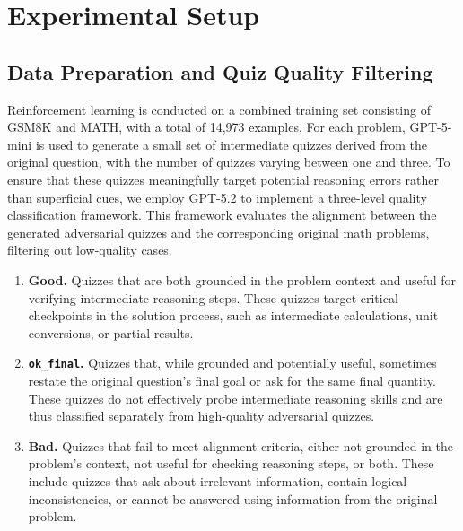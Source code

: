 \documentclass[12pt]{report}
\newcommand{\flag}[1]{\texttt{#1}}
\begin{document}
\section{Experimental Setup}

\subsection{Data Preparation and Quiz Quality Filtering}
\label{sec:data-prep}
Reinforcement learning is conducted on a combined training set consisting of GSM8K and MATH, with a total of 14,973 examples. For each problem, GPT-5-mini is used to  generate a small set of intermediate quizzes derived from the original question, with the number of quizzes varying between one and three. To ensure that these quizzes meaningfully target potential reasoning errors rather than superficial cues, we employ GPT-5.2 to implement a three-level quality classification framework. This framework evaluates the alignment between the generated adversarial quizzes and the corresponding original math problems, filtering out low-quality cases.

\begin{enumerate}
  \item \textbf{Good.}
  Quizzes that are both grounded in the problem context and useful for
  verifying intermediate reasoning steps. These quizzes target critical
  checkpoints in the solution process, such as intermediate calculations,
  unit conversions, or partial results.

  \item \textbf{\flag{ok\_final}.}
  Quizzes that, while grounded and potentially useful, sometimes restate
  the original question's final goal or ask for the same final quantity.
  These quizzes do not effectively probe intermediate reasoning skills and are thus classified separately from high-quality adversarial quizzes.

  \item \textbf{Bad.}
  Quizzes that fail to meet alignment criteria, either not grounded in the
  problem's context, not useful for checking reasoning steps, or both.
  These include quizzes that ask about irrelevant information, contain
  logical inconsistencies, or cannot be answered using information from
  the original problem.
\end{enumerate}

\end{document}

